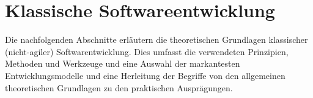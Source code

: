 \section{Klassische Softwareentwicklung}
\label{Klassische Softwareentwicklung}
Die nachfolgenden Abschnitte erläutern die theoretischen Grundlagen klassischer (nicht-agiler) Softwarentwicklung. Dies umfasst die verwendeten Prinzipien, Methoden und Werkzeuge und eine Auswahl der markantesten Entwicklungsmodelle und eine Herleitung der Begriffe von den allgemeinen theoretischen Grundlagen zu den praktischen Ausprägungen.